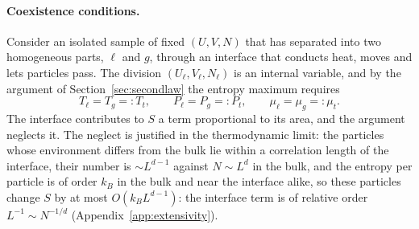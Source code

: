 \documentclass[10pt,a4paper]{article}
\theoremstyle{remark}
\begin{document}
\paragraph{Coexistence conditions.} Consider an isolated sample of fixed
$(U,V,N)$ that has separated into two homogeneous parts, $\ell$ and $g$,
through an interface that conducts heat, moves and lets particles pass. The
division $(U_\ell,V_\ell,N_\ell)$ is an internal variable, and by the argument
of Section~\ref{sec:secondlaw} the entropy maximum requires
\begin{equation}\label{eq:coex}
  T_\ell=T_g=:T_t,\qquad P_\ell=P_g=:P_t,\qquad \mu_\ell=\mu_g=:\mu_t .
\end{equation}
The interface contributes to $S$ a term proportional to its area, and the
argument neglects it. The neglect is justified in the thermodynamic limit: the
particles whose environment differs from the bulk lie within a correlation
length of the interface, their number is $\sim L^{d-1}$ against $N\sim L^{d}$
in the bulk, and the entropy per particle is of order $k_B$ in the bulk and
near the interface alike, so these particles change $S$ by at most
$O(k_BL^{d-1})$:
the interface term is of relative order $L^{-1}\sim N^{-1/d}$
(Appendix~\ref{app:extensivity}).
\end{document}
